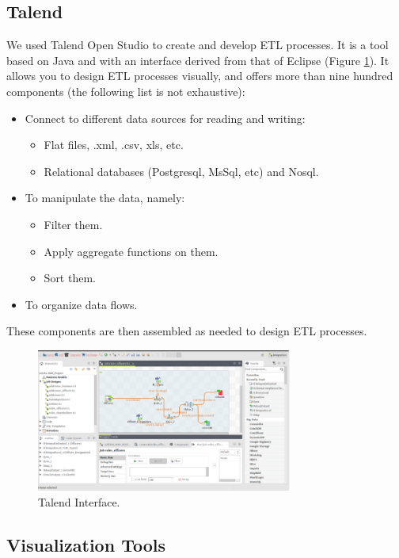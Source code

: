 \subsection{Talend}
\label{sec:talend}
We used  Talend Open Studio to create and develop ETL processes. It is a tool based on Java and with an interface derived from that of Eclipse (Figure \ref{fig:Talend}). It allows you to design ETL processes visually, and offers more than nine hundred components (the following list is not exhaustive)\cite{TalendOpenStudio}: 
\begin{itemize}
\renewcommand{\labelitemi}{$\bullet$}
\item Connect to different data sources for reading and writing:
\begin{itemize}
\item Flat files, .xml, .csv, xls, etc.
\item Relational databases (Postgresql, MsSql, etc) and Nosql.
\end{itemize}
\item To manipulate the data, namely:
\begin{itemize}
\item Filter them.
\item Apply aggregate functions on them.
\item Sort them.
\end{itemize}
\item To organize data flows.
\end{itemize}
These components are then assembled as needed to design ETL processes\cite{mehdiPfe}.
\begin{figure}[h!]
    \center
    \includegraphics[width=0.75\textwidth]{images/chapter4/talendInterface.png}
    \caption{Talend Interface.}
    \label{fig:Talend}
\end{figure}
\subsection{Visualization Tools}

